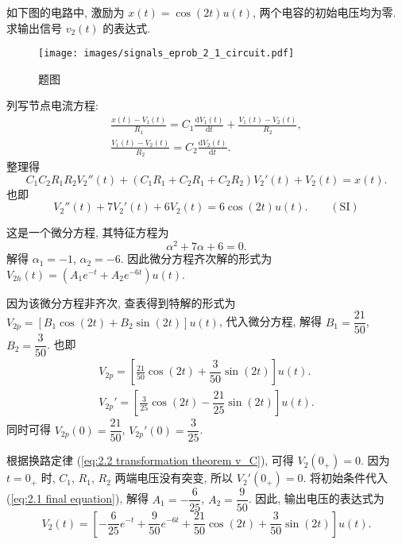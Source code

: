 \begin{exampleprob}
    如下图的电路中, 激励为 $x(t)=\cos(2t)u(t)$, 两个电容的初始电压均为零. 求输出信号 $v_2(t)$ 的表达式.

    \begin{figure}[H]
        \centering
        \texttt{[image: images/signals\_eprob\_2\_1\_circuit.pdf]}
        \caption{题图}
    \end{figure}

    \begin{solution}
        列写节点电流方程:
        \begin{gather*}
            \frac{x(t)-V_1(t)}{R_1}=C_1\frac{\mathrm{d}V_1(t)}{\mathrm{d}t}+\frac{V_1(t)-V_2(t)}{R_2}, \\
            \frac{V_1(t)-V_2(t)}{R_2}=C_2\frac{\mathrm{d}V_2(t)}{\mathrm{d}t}.
        \end{gather*}
        整理得
        \begin{equation*}
            C_1C_2R_1R_2V_2''(t)+(C_1R_1+C_2R_1+C_2R_2)V_2'(t)+V_2(t)=x(t).
        \end{equation*}
        也即
        \begin{equation*}
            V_2''(t)+7V_2'(t)+6V_2(t)=6\cos(2t)u(t).\qquad (\textrm{SI})
        \end{equation*}

        这是一个微分方程, 其特征方程为
        \begin{equation*}
            \alpha^2+7\alpha+6=0.
        \end{equation*}
        解得 $\alpha_1=-1$, $\alpha_2=-6$. 因此微分方程齐次解的形式为 $V_{2h}(t)=(A_1e^{-t}+A_2e^{-6t})u(t)$.

        因为该微分方程非齐次, 查表得到特解的形式为 $V_{2p}=[B_1\cos(2t)+B_2\sin(2t)]u(t)$, 代入微分方程, 解得 $B_1=\dfrac{21}{50}$, $B_2=\dfrac{3}{50}$. 也即
        \begin{gather*}
            V_{2p}=\left[\frac{21}{50}\cos(2t)+\dfrac{3}{50}\sin(2t)\right]u(t). \\
            V_{2p}'=\left[\frac{3}{25}\cos(2t)-\dfrac{21}{25}\sin(2t)\right]u(t).
        \end{gather*}
        同时可得 $V_{2p}(0)=\dfrac{21}{50}$, $V_{2p}'(0)=\dfrac{3}{25}$.

        根据换路定律 (\ref{eq:2.2 transformation theorem v_C}), 可得 $V_2(0_+)=0$. 因为 $t=0_+$ 时, $C_1$, $R_1$, $R_2$ 两端电压没有突变, 所以 $V_2'(0_+)=0$. 将初始条件代入 (\ref{eq:2.1 final equation}), 解得 $A_1=-\dfrac{6}{25}$, $A_2=\dfrac{9}{50}$. 因此, 输出电压的表达式为
        \begin{equation*}
            V_2(t)=\left[-\dfrac{6}{25}e^{-t}+\dfrac{9}{50}e^{-6t}+\dfrac{21}{50}\cos(2t)+\dfrac{3}{50}\sin(2t)\right]u(t).
        \end{equation*}
    \end{solution}
\end{exampleprob}
